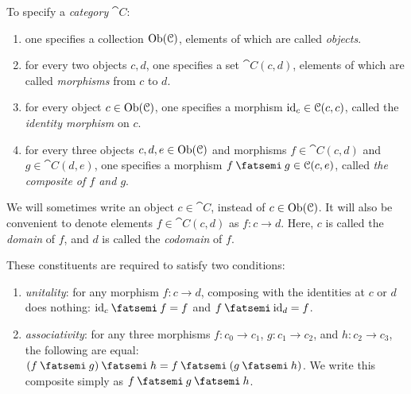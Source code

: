 \documentclass[7Sketches]{subfiles}
\begin{document}
\begin{definition}%
\label{def.category}%
To specify a \emph{category} $\cat{C}$:
\begin{enumerate}[label=(\roman*)]
	\item one specifies a collection%
	$\operatorname{Ob}(\mathcal{C})$, elements of which are called
	\emph{objects}.%
%
	\item for every two objects $c,d$, one specifies a set $\cat{C}(c,d)$,%
	elements of which are called \emph{morphisms} from
	$c$ to $d$.%
	\item for every object $c\in \operatorname{Ob}(\mathcal{C})$, one specifies a morphism $\mathrm{id}_c\in
	\mathcal{C}(c,c)$, called the \emph{identity morphism} on
	$c$.%
%
	\item for every three objects $c,d,e\in\operatorname{Ob}(\mathcal{C})$ and morphisms $f\in
	\cat{C}(c,d)$ and $g\in \cat{C}(d,e)$, one specifies a morphism $f\cp g\in \cat{C}(c,e)$, called \emph{the composite of $f$ and $g$}.%
%
%
\end{enumerate}
We will sometimes write an object $c \in \cat{C}$, instead of $c \in
\operatorname{Ob}(\mathcal{C})$. It will also be convenient to denote elements $f\in\cat{C}(c,d)$
as $f\colon c\to d$. Here, $c$ is called the \emph{domain} of $f$, and $d$ is
called the \emph{codomain} of $f$.%
%
%
%

These constituents are required to satisfy two conditions:
\begin{enumerate}[label=(\alph*)]
	\item \emph{unitality}: for any morphism $f\colon c\to d$, composing with the identities at $c$ or $d$ does nothing: $\id_c\cp f=f$ and $f\cp \id_d=f$.
	\item \emph{associativity}: for any three morphisms $f\colon c_0\to
	c_1$, $g\colon c_1\to c_2$, and $h\colon c_2\to c_3$, the following are
	equal: $(f\cp g)\cp h=f\cp (g\cp h)$. We write this composite simply as $f\cp g\cp h$.
\end{enumerate}
\end{definition}%
%
\end{document}

